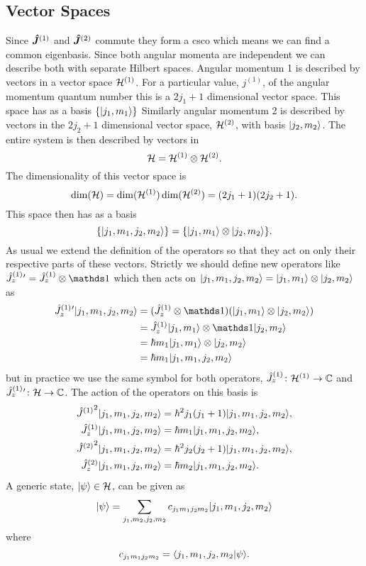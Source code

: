 \subsection{Vector Spaces}
Since \(\bm{\hat{J}}^{(1)}\) and \(\bm{\hat{J}}^{(2)}\) commute they form a \gls{csco} which means we can find a common eigenbasis.
Since both angular momenta are independent we can describe both with separate Hilbert spaces.
Angular momentum 1 is described by vectors in a vector space \(\mathcal{H}^{(1)}\).
For a particular value, \(j^{(1)}\), of the angular momentum quantum number this is a \(2j_1 + 1\) dimensional vector space.
This space has as a basis \(\{\vert {j_1, m_1} \rangle\}\)
Similarly angular momentum 2 is described by vectors in the \(2j_2 + 1\) dimensional vector space, \(\mathcal{H}^{(2)}\), with basis \(\vert {j_2, m_2} \rangle\).
The entire system is then described by vectors in
\[\mathcal{H} = \mathcal{H}^{(1)}\otimes\mathcal{H}^{(2)}.\]
The dimensionality of this vector space is
\[\dim(\mathcal{H}) = \dim(\mathcal{H}^{(1)})\dim(\mathcal{H}^{(2)}) = (2j_1 + 1)(2j_2 + 1).\]
This space then has as a basis
\[\{\vert {j_1, m_1, j_2, m_2} \rangle\} = \{\vert {j_1, m_1} \rangle\otimes\vert {j_2, m_2} \rangle\}.\]
As usual we extend the definition of the operators so that they act on only their respective parts of these vectors.
Strictly we should define new operators like \({\operator{J}^{(1)}_z}{'} = \operator{J}^{(1)}_z\tensorProd\ident\) which then acts on \(\vert {j_1, m_1, j_2, m_2} \rangle = \vert {j_1, m_1} \rangle\otimes\vert {j_2, m_2} \rangle\) as
\begin{align*}
    {\operator{J}^{(1)}_z}{'}\ket{j_1, m_1, j_2, m_2} &= (\operator{J}^{(1)}_z\tensorProd\ident)(\ket{j_1, m_1}\tensorProd\ket{j_2, m_2})\\
    &= \operator{J}^{(1)}_z\ket{j_1, m_1}\tensorProd\ident\ket{j_2, m_2}\\
    &= \hbar m_1\ket{j_1, m_1}\tensorProd\ket{j_2, m_2}\\
    &= \hbar m_1\ket{j_1, m_1, j_2, m_2}
\end{align*}
but in practice we use the same symbol for both operators, \(\hat{J}^{(1)}_z\colon\mathcal{H}^{(1)}\to\mathbb{C}\) and \(\hat{J}^{(1)}_z{'}\colon\mathcal{H}\to\mathbb{C}\).
The action of the operators on this basis is
\begin{align*}
    \angmomsquared{1}\ket{j_1, m_1, j_2, m_2} &= \hbar^2j_1(j_1 + 1)\ket{j_1, m_1, j_2, m_2},\\
    \operator{J}^{(1)}_z\ket{j_1, m_1, j_2, m_2} &= \hbar m_1\ket{j_1, m_1, j_2, m_2},\\
    \angmomsquared{2}\ket{j_1, m_1, j_2, m_2} &= \hbar^2j_2(j_2 + 1)\ket{j_1, m_1, j_2, m_2},\\
    \operator{J}^{(2)}_z\ket{j_1, m_1, j_2, m_2} &= \hbar m_2\ket{j_1, m_1, j_2, m_2}.
\end{align*}
A generic state, \(\vert {\psi} \rangle\in\mathcal{H}\), can be given as
\[\vert {\psi} \rangle = \sum_{j_1, m_2, j_2, m_2} c_{j_1m_1j_2m_2}\vert {j_1, m_1, j_2, m_2} \rangle\]
where
\[c_{j_1m_1j_2m_2} = \langle {j_1, m_1, j_2, m_2} \vert {\psi} \rangle.\]

